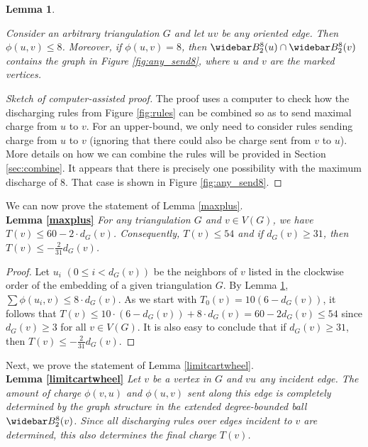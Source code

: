 \documentclass[10pt,a4paper]{article}
\newtheorem{lem}[thm]{Lemma}
\renewcommand{\bar}{\widebar}
\def\showlabel#1{}
\begin{document}

% 

\begin{lem}
\label{lem:vsends-noconf}
\showlabel{lem:vsends-noconf}
Consider an arbitrary triangulation $G$ and let $uv$ be any oriented edge. Then
$\phi(u,v) \leq 8$. Moreover, if $\phi(u,v)=8$, then $\bar B_2^8(u) \cap \bar B_2^8(v)$ contains the graph in Figure \ref{fig:any_send8}, where $u$ and $v$ are the marked vertices.
\end{lem}

\begin{proof}[Sketch of computer-assisted proof] 
The proof uses a computer to check how the discharging rules from 
Figure \ref{fig:rules} can be combined so as to send maximal charge from $u$ to $v$. For an upper-bound, we only need to consider
rules sending charge from $u$ to $v$ (ignoring that there could also be charge sent from $v$ to $u$). 
More details on how we can combine the rules will be provided in Section \ref{sec:combine}. It appears that there is precisely one possibility with the maximum discharge of 8. That case is shown in Figure \ref{fig:any_send8}.
\end{proof}

We can now prove the statement of Lemma \ref{maxplus}. \smallskip \\
{\bf Lemma \ref{maxplus}} {\em
For any triangulation $G$ and $v \in V(G)$, we have $T(v) \leq 60 - 2 \cdot d_G(v)$. 
Consequently, $T(v) \leq 54$ and if $d_G(v) \geq 31$, then $T(v) \le -\tfrac{2}{31} d_G(v)$.}

\begin{proof}
Let $u_i$ $(0 \leq i < d_G(v))$ be the neighbors of $v$ listed in the clockwise order of the embedding of a given triangulation $G$. By Lemma \ref{lem:vsends-noconf}, $\sum \phi(u_i,v) \leq 8 \cdot d_G(v)$.
As we start with $T_0(v) = 10(6 - d_G(v))$, 
it follows that $T(v) \leq 10 \cdot (6-d_G(v))+8 \cdot d_G(v) = 60-2d_G(v) \leq 54$ since $d_G(v) \geq 3$ for all $v \in V(G)$. It is also easy to conclude that if $d_G(v) \geq 31$, then $T(v) \le -\tfrac{2}{31} d_G(v)$.
\end{proof}

Next, we prove the statement of Lemma \ref{limitcartwheel}. \smallskip \\
{\bf Lemma \ref{limitcartwheel}}
{\em Let $v$ be a vertex in $G$ and $vu$ any incident edge. The amount of charge $\phi(v,u)$ and $\phi(u,v)$ sent along this edge is completely determined by the graph structure in the extended degree-bounded ball $\bar B_2^8(v)$. Since all discharging rules over edges incident to $v$ are determined, this also determines the final charge $T(v)$.}
\end{document}
